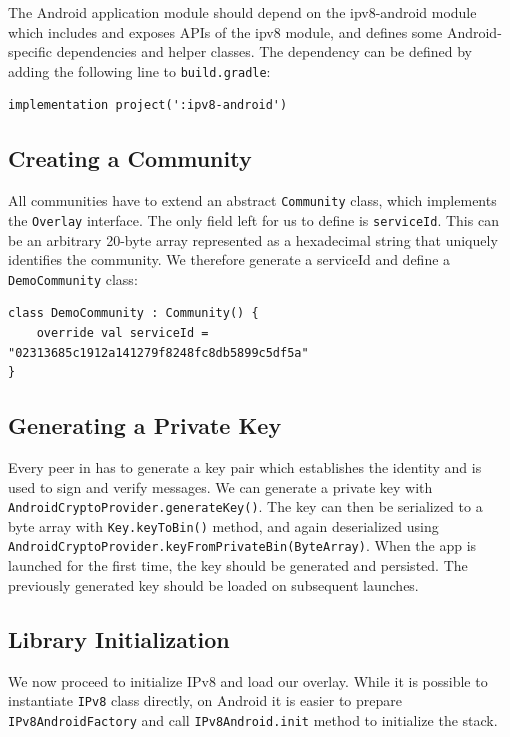 The Android application module should depend on the ipv8-android module which includes and exposes APIs of the ipv8 module, and defines some Android-specific dependencies and helper classes. The dependency can be defined by adding the following line to \texttt{build.gradle}:

\begin{verbatim}
implementation project(':ipv8-android')
\end{verbatim}

\subsection{Creating a Community}

All communities have to extend an abstract \texttt{Community} class, which implements the \texttt{Overlay} interface. The only field left for us to define is \texttt{serviceId}. This can be an arbitrary 20-byte array represented as a hexadecimal string that uniquely identifies the community. We therefore generate a serviceId and define a \texttt{DemoCommunity} class:

\begin{verbatim}
class DemoCommunity : Community() {
    override val serviceId = "02313685c1912a141279f8248fc8db5899c5df5a"
}
\end{verbatim}


\subsection{Generating a Private Key}

Every peer in has to generate a key pair which establishes the identity and is used to sign and verify messages. We can generate a private key with \texttt{AndroidCryptoProvider.generateKey()}. The key can then be serialized to a byte array with \texttt{Key.keyToBin()} method, and again deserialized using \texttt{AndroidCryptoProvider.keyFromPrivateBin(ByteArray)}. When the app is launched for the first time, the key should be generated and persisted. The previously generated key should be loaded on subsequent launches.

\subsection{Library Initialization}

We now proceed to initialize IPv8 and load our overlay. While it is possible to instantiate \texttt{IPv8} class directly, on Android it is easier to prepare \texttt{IPv8AndroidFactory} and call \texttt{IPv8Android.init} method to initialize the stack.

